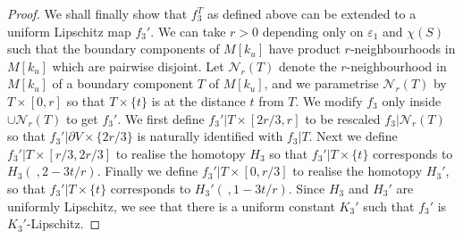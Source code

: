 \documentclass{amsart}
\theoremstyle{definition}
\numberwithin{figure}{section}
\numberwithin{equation}{section}
\newcommand{\blackboard}[1]{\ensuremath{\mathbb{#1}}}
\newcommand{\naturals}{\blackboard{N}}
\def\cv{\mathcal{V}}
\begin{document}
\begin{proof}
We shall finally show that $f_3^T$ as defined above can be extended to a uniform Lipschitz map $f_3'$.
We can take $r>0$ depending only on $\varepsilon_1$ and $\chi(S)$ such that the boundary components of $M[k_u]$ have product $r$-neighbourhoods in $M[k_u]$ which are pairwise disjoint.
Let $\mathcal N_r(T)$ denote the $r$-neighbourhood in $M[k_u]$ of a boundary component $T$ of $M[k_u]$, and we parametrise $\mathcal N_r(T)$ by $T \times [0,r]$ so that $T \times \{t\}$ is at the distance $t$ from $T$.
We modify $f_3$ only inside $\cup \mathcal N_r(T)$ to get $f_3'$.
We first define $f_3'| T\times [2r/3, r]$ to be rescaled $f_3|\mathcal N_r(T)$ so that $f_3'|\partial V \times \{2r/3\}$ is naturally identified with $f_3|T$.
Next we define $f_3'| T\times [r/3, 2r/3]$ to realise the homotopy $H_3$ so that  $f_3'|T \times \{t\}$ corresponds to $H_3(\ ,2-3t/r)$.
Finally we define $f_3'|T \times [0,r/3]$ to realise the homotopy $H_3'$, so that $f_3'| T \times \{t\}$ corresponds to $H_3'(\ , 1-3t/r)$.
Since  $H_3$ and $H_3'$ are  uniformly Lipschitz, we see that there is a uniform constant $K_3'$ such that $f_3'$ is $K_3'$-Lipschitz.
%

\end{proof}
\end{document}
